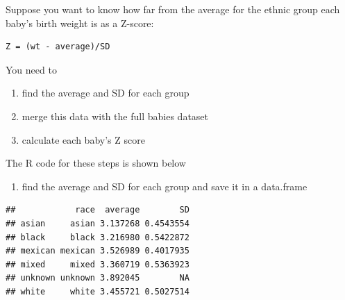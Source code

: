 \documentclass[
]{book}
\newenvironment{Shaded}{\begin{snugshade}}{\end{snugshade}}
\newcommand{\AttributeTok}[1]{\textcolor[rgb]{0.77,0.63,0.00}{#1}}
\newcommand{\FunctionTok}[1]{\textcolor[rgb]{0.00,0.00,0.00}{#1}}
\newcommand{\NormalTok}[1]{#1}
\newcommand{\OtherTok}[1]{\textcolor[rgb]{0.56,0.35,0.01}{#1}}
\newcommand{\SpecialCharTok}[1]{\textcolor[rgb]{0.00,0.00,0.00}{#1}}
\providecommand{\tightlist}{%
  \setlength{\itemsep}{0pt}\setlength{\parskip}{0pt}}
\begin{document}
Suppose you want to know how far from the average for the ethnic group each baby's birth weight is as a Z-score:

\begin{verbatim}
Z = (wt - average)/SD
\end{verbatim}

You need to

\begin{enumerate}
\def\labelenumi{\arabic{enumi}.}
\tightlist
\item
  find the average and SD for each group
\item
  merge this data with the full babies dataset
\item
  calculate each baby's Z score
\end{enumerate}

The R code for these steps is shown below

\begin{enumerate}
\def\labelenumi{\arabic{enumi}.}
\tightlist
\item
  find the average and SD for each group and save it in a data.frame
\end{enumerate}

\begin{Shaded}
\end{Shaded}

\begin{verbatim}
##            race  average        SD
## asian     asian 3.137268 0.4543554
## black     black 3.216980 0.5422872
## mexican mexican 3.526989 0.4017935
## mixed     mixed 3.360719 0.5363923
## unknown unknown 3.892045        NA
## white     white 3.455721 0.5027514
\end{verbatim}
\end{document}
